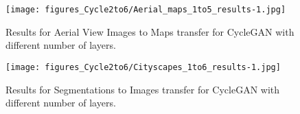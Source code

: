 \documentclass{article} %
\begin{document}
\begin{figure}[t]
  \centering
 \texttt{[image: figures\_Cycle2to6/Aerial\_maps\_1to5\_results-1.jpg]}
  \caption{\label{fig:aer001}  Results for Aerial View Images to Maps transfer for CycleGAN with different number of layers. }
\end{figure}

\begin{figure}[t]
  \centering
 \texttt{[image: figures\_Cycle2to6/Cityscapes\_1to6\_results-1.jpg]}
  \caption{\label{fig:seg001} Results for Segmentations to Images transfer for CycleGAN with different number of layers. }
\end{figure}
\end{document}
